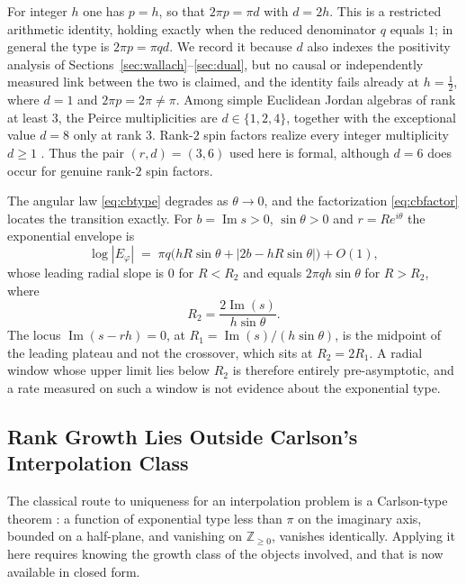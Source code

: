 \documentclass[11pt,letterpaper]{article}
\newcommand{\Zint}{\mathbb{Z}}
\begin{document}
For integer $h$ one has $p=h$, so that $2\pi p=\pi d$ with $d=2h$. This is a
restricted arithmetic identity, holding exactly when the reduced denominator
$q$ equals $1$; in general the type is $2\pi p=\pi q d$. We record it because
$d$ also indexes the positivity analysis of Sections~\ref{sec:wallach}--\ref{sec:dual}, but no
causal or independently measured link between the two is claimed, and the
identity fails already at $h=\tfrac12$, where $d=1$ and $2\pi p=2\pi\neq\pi$.
Among simple Euclidean Jordan algebras of rank at least $3$, the Peirce
multiplicities are $d\in\{1,2,4\}$, together with the exceptional value $d=8$
only at rank $3$. Rank-$2$ spin factors realize every integer multiplicity
$d\ge1$ \cite[Ch.~V]{FK}. Thus the pair $(r,d)=(3,6)$ used here is formal,
although $d=6$ does occur for genuine rank-$2$ spin factors.

\begin{remark}
\label{rem:cusp}
The angular law \eqref{eq:cbtype} degrades as $\theta\to0$, and the
factorization \eqref{eq:cbfactor} locates the transition exactly. For
$b=\operatorname{Im}s>0$, $\sin\theta>0$ and $r=Re^{i\theta}$ the exponential
envelope is
\begin{equation}
  \log|E_\varphi|
  \;=\;\pi q\bigl(hR\sin\theta+\lvert 2b-hR\sin\theta\rvert\bigr)+O(1),
  \label{eq:envelope}
\end{equation}
whose leading radial slope is $0$ for $R<R_2$ and equals
$2\pi qh\sin\theta$ for $R>R_2$, where
\begin{equation*}
  R_2=\frac{2\operatorname{Im}(s)}{h\sin\theta}.
\end{equation*}
The locus
$\operatorname{Im}(s-rh)=0$, at $R_1=\operatorname{Im}(s)/(h\sin\theta)$, is the
midpoint of the leading plateau and not the crossover, which sits at $R_2=2R_1$.
A radial window whose upper limit lies below $R_2$ is therefore entirely
pre-asymptotic, and a rate measured on such a window is not evidence about the
exponential type.
\end{remark}

\subsection{Rank Growth Lies Outside Carlson's Interpolation Class}

The classical route to uniqueness for an interpolation problem is a Carlson-type
theorem \cite[Ch.~9]{Boas}: a function of exponential type less than $\pi$ on the
imaginary axis, bounded on a half-plane, and vanishing on $\Zint_{\ge0}$,
vanishes identically.
Applying it here requires knowing the growth class of the objects involved, and
that is now available in closed form.
\end{document}
